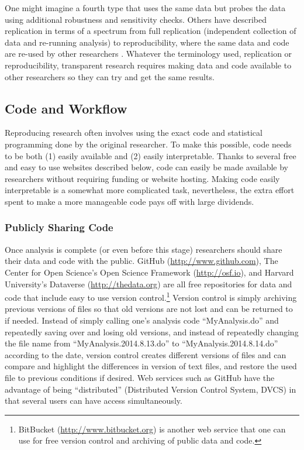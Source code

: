 \documentclass[12pt] {article}
\begin{document}
One might imagine a fourth type that uses the same data but probes the data using additional robustness and sensitivity checks. Others have described replication in terms of a spectrum from full replication (independent collection of data and re-running analysis) to
reproducibility, where the same data and code are re-used by other
researchers \citep{peng_reproducible_2011}. Whatever the terminology used, replication or reproducibility, transparent research requires making data and code available to other researchers so they can try and get the same results.


\subsection{Code and Workflow}\label{code-and-workflow}

Reproducing research often involves using the exact code and statistical
programming done by the original researcher. To make this possible, code
needs to be both (1) easily available and (2) easily interpretable.
Thanks to several free and easy to use websites described below, code
can easily be made available by researchers without requiring funding or
website hosting. Making code easily interpretable is a somewhat more complicated
task, nevertheless, the extra effort spent to make a more manageable
code pays off with large dividends.

\subsubsection{Publicly Sharing Code}\label{publicly-sharing-code}

Once analysis is complete (or even before this stage) researchers should
share their data and code with the public. GitHub
(\url{http://www.github.com}), The Center for Open Science's Open
Science Framework (\url{http://osf.io}), and Harvard University's
Dataverse (\url{http://thedata.org}) are all free repositories for data
and code that include easy to use version control.\footnote{BitBucket
  (\href{styles.xml}{http://www.bitbucket.org}) is another
  web service that one can use for free version control and archiving
  of public data and code.} Version control is simply archiving previous
versions of files so that old versions are not lost and can be returned
to if needed. Instead of simply calling one's analysis code
``MyAnalysis.do'' and repeatedly saving over and losing old versions,
and instead of repeatedly changing the file name from
``MyAnalysis.2014.8.13.do'' to ``MyAnalysis.2014.8.14.do'' according to
the date, version control creates different versions of files and can
compare and highlight the differences in version of text files, and
restore the used file to previous conditions if desired. Web services
such as GitHub have the advantage of being ``distributed'' (Distributed Version Control System, DVCS) in
that several users can have access simultaneously.
\end{document}
